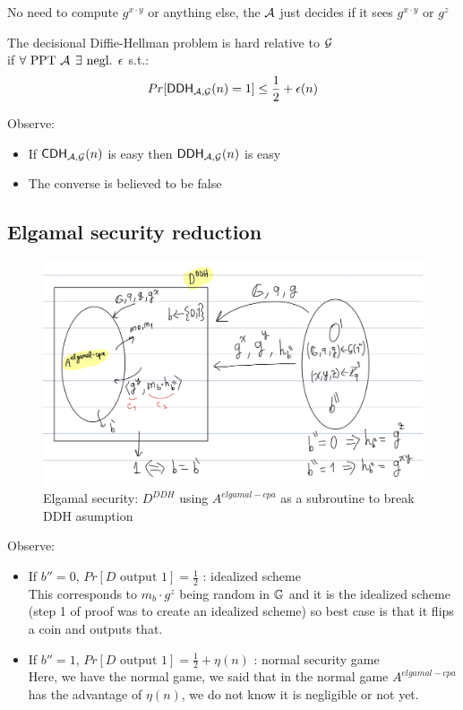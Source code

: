 \documentclass[12pt]{article}
\begin{document}
No need to compute $g^{x\cdot y}$ or anything else, the $\mathcal{A}$ just decides if it sees $g^{x\cdot y}$ or $g^z$


The decisional Diffie-Hellman problem is hard relative to $\mathcal{G}$\\
 if $\forall  \text{ PPT } \mathcal{A}$ $\exists \text{ negl. } \epsilon $ s.t.:
\begin{equation*}
Pr[\mathsf{DDH}_{\mathcal{A},\mathcal{G}}(n)=1] \le \frac12+ \epsilon(n)
\end{equation*}

Observe:
\begin{itemize}
\item If $\mathsf{CDH}_{\mathcal{A},\mathcal{G}}(n)$ is easy then $\mathsf{DDH}_{\mathcal{A},\mathcal{G}}(n)$ is easy
\item The converse is believed to be false
\end{itemize}
\subsection{Elgamal security reduction}
\begin{figure}[ht]
    \centering
    \includegraphics[width=16cm]{figures/f1.png}
    \caption{Elgamal security: $D^{DDH}$ using $A^{elgamal-cpa}$ as a subroutine to break DDH asumption}
\end{figure}
Observe:
\begin{itemize}
\item If $b''=0$, $Pr[D \text{ output } 1] = \frac12$ : idealized scheme\\
This corresponds to $m_b\cdot g^z$ being random in $\mathbb{G}$ and it is the idealized scheme (step 1 of proof was to create an idealized scheme) so best case is that it flips a coin and outputs that.
\item If $b''=1$, $Pr[D \text{ output } 1] = \frac12 + \eta(n)$ : normal security game\\
Here, we have the normal game, we said that in the normal game $A^{elgamal-cpa}$ has the advantage of $\eta(n)$, we do not know it is negligible or not yet.
\end{itemize}
\end{document}
